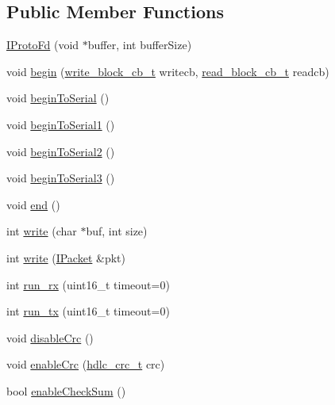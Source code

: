 \subsection*{Public Member Functions}
\begin{DoxyCompactItemize}
\item 
\hyperlink{classTiny_1_1IProtoFd_a65976c6faaf41504b7c15036edc054cf}{I\+Proto\+Fd} (void $\ast$buffer, int buffer\+Size)
\item 
void \hyperlink{classTiny_1_1IProtoFd_aae4e613316866105c130d613ecb25dd4}{begin} (\hyperlink{tiny__types_8h_aafd634660bba76cace57a8f9b01e044d}{write\+\_\+block\+\_\+cb\+\_\+t} writecb, \hyperlink{tiny__types_8h_a15bec127d9ee63658563d62e92b5261b}{read\+\_\+block\+\_\+cb\+\_\+t} readcb)
\item 
void \hyperlink{classTiny_1_1IProtoFd_a1cf42b4182e49dcde4862a768d07c811}{begin\+To\+Serial} ()
\item 
void \hyperlink{classTiny_1_1IProtoFd_a7d41a0caae1d5e6808a441c821ed8927}{begin\+To\+Serial1} ()
\item 
void \hyperlink{classTiny_1_1IProtoFd_ae7582aca0fa5472da6f4ae2911d56259}{begin\+To\+Serial2} ()
\item 
void \hyperlink{classTiny_1_1IProtoFd_a2d4df949358d4e8afa391e8960729d71}{begin\+To\+Serial3} ()
\item 
void \hyperlink{classTiny_1_1IProtoFd_ad17e76d0ef7ea40838e51acc2498c482}{end} ()
\item 
int \hyperlink{classTiny_1_1IProtoFd_adea59df6702e16fd986a91c7ee62012a}{write} (char $\ast$buf, int size)
\item 
int \hyperlink{classTiny_1_1IProtoFd_aa822a1dec320e6edc70a84699371fe81}{write} (\hyperlink{classTiny_1_1IPacket}{I\+Packet} \&pkt)
\item 
int \hyperlink{classTiny_1_1IProtoFd_a37292eb5c9faf1be8c4850985e0ae2eb}{run\+\_\+rx} (uint16\+\_\+t timeout=0)
\item 
int \hyperlink{classTiny_1_1IProtoFd_a19be0bd5124009c7de051554841070b3}{run\+\_\+tx} (uint16\+\_\+t timeout=0)
\item 
void \hyperlink{classTiny_1_1IProtoFd_af41446f47a7c520ff8f9683e6ae45614}{disable\+Crc} ()
\item 
void \hyperlink{classTiny_1_1IProtoFd_a7dec2906051505034e91b503318a5563}{enable\+Crc} (\hyperlink{group__HDLC__API_gabb73b32d08d8e79eefe9385634a74bf7}{hdlc\+\_\+crc\+\_\+t} crc)
\item 
bool \hyperlink{classTiny_1_1IProtoFd_a0f43402e86ea64f5c0154477d84b0c7c}{enable\+Check\+Sum} ()

\end{DoxyCompactItemize}
